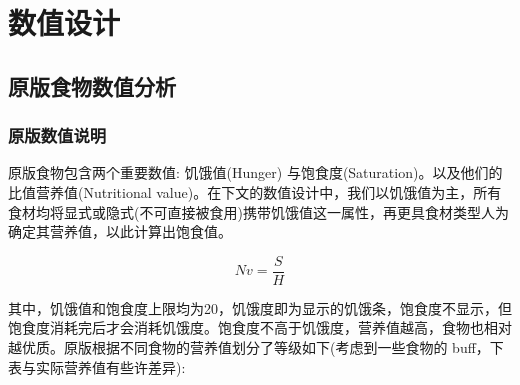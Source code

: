 \section{数值设计}
\subsection{原版食物数值分析}

\subsubsection{原版数值说明}

原版食物包含两个重要数值: 饥饿值(Hunger) 与饱食度(Saturation)。以及他们的比值营养值(Nutritional value)。在下文的数值设计中，我们以饥饿值为主，所有食材均将显式或隐式(不可直接被食用)携带饥饿值这一属性，再更具食材类型人为确定其营养值，以此计算出饱食值。

\begin{equation}
    Nv = \frac{S}{H}
\end{equation}

其中，饥饿值和饱食度上限均为20，饥饿度即为显示的饥饿条，饱食度不显示，但饱食度消耗完后才会消耗饥饿度。饱食度不高于饥饿度，营养值越高，食物也相对越优质。原版根据不同食物的营养值划分了等级如下(考虑到一些食物的 buff，下表与实际营养值有些许差异):

